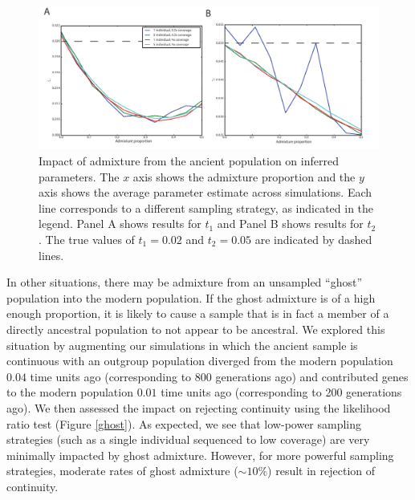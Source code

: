 \documentclass[11pt, oneside]{article}   	%
\begin{document}
\begin{figure}[h] %
   \centering
   \includegraphics[width=\textwidth]{t1_t2_admixture.pdf} 
   \caption{Impact of admixture from the ancient population on inferred parameters. The $x$ axis shows the admixture proportion and the $y$ axis shows the average parameter estimate across simulations. Each line corresponds to a different sampling strategy, as indicated in the legend. Panel A shows results for $t_1$ and Panel B shows results for $t_2$. The true values of $t_1 = 0.02$ and $t_2 = 0.05$ are indicated by dashed lines.}
   \label{admixture}
\end{figure}

In other situations, there may be admixture from an unsampled ``ghost'' population into the modern population. If the ghost admixture is of a high enough proportion, it is likely to cause a sample that is in fact a member of a directly ancestral population to not appear to be ancestral. We explored this situation by augmenting our simulations in which the ancient sample is continuous with an outgroup population diverged from the modern population $0.04$ time units ago (corresponding to 800 generations ago) and contributed genes to the modern population $0.01$ time units ago (corresponding to 200 generations ago). We then assessed the impact on rejecting continuity using the likelihood ratio test (Figure \ref{ghost}). As expected, we see that low-power sampling strategies (such as a single individual sequenced to low coverage) are very minimally impacted by ghost admixture. However, for more powerful sampling strategies, moderate rates of ghost admixture ($\sim 10\%$) result in rejection of continuity.  
\end{document}
